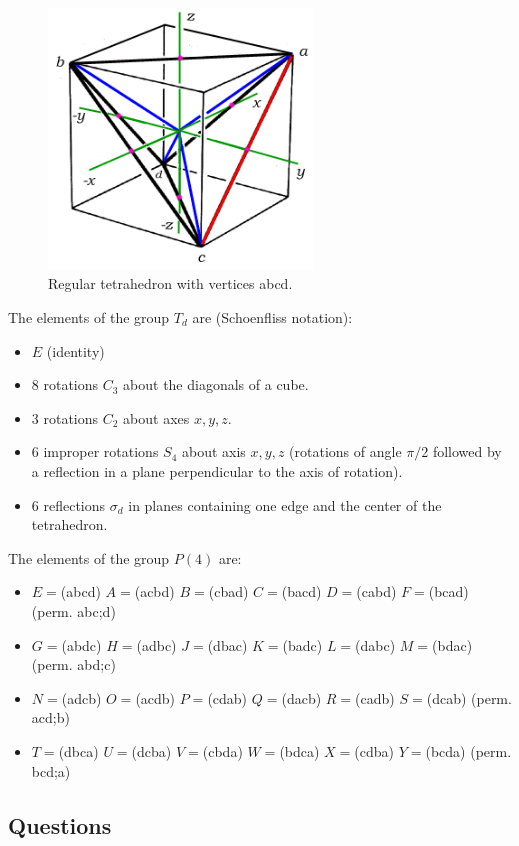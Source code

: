 \begin{figure}[h]
  \centering
  \includegraphics[width=7cm]{xyzcube.png}
  \caption{Regular tetrahedron with vertices abcd.}
\end{figure}

The elements of the group $T_d$ are (Schoenfliss notation):

\begin{itemize}
\item $E$ (identity)
\item 8 rotations  $C_3$ about the diagonals of a cube.
\item 3 rotations $C_2$ about axes $x, y , z$.
\item 6 improper rotations $S_4$ about axis $x, y , z$ (rotations
of angle $\pi/2$ followed by a reflection in a plane perpendicular to
the axis of rotation).
\item 6 reflections $\sigma_d$ in planes containing one edge and the center of
  the tetrahedron.
\end{itemize}

The elements of the group $P(4)$ are:

\begin{itemize}
\item $E=$(abcd) $A=$(acbd) $B=$(cbad) $C=$(bacd) $D=$(cabd)
  $F=$(bcad) (perm. abc;d)
\item $G=$(abdc) $H=$(adbc) $J=$(dbac) $K=$(badc) $L=$(dabc)
  $M=$(bdac) (perm. abd;c)
\item $N=$(adcb) $O=$(acdb) $P=$(cdab) $Q=$(dacb) $R=$(cadb)
  $S=$(dcab) (perm. acd;b)
\item $T=$(dbca) $U=$(dcba) $V=$(cbda) $W=$(bdca) $X=$(cdba) $Y=$(bcda) (perm. bcd;a)
\end{itemize}

\subsection{Questions}

